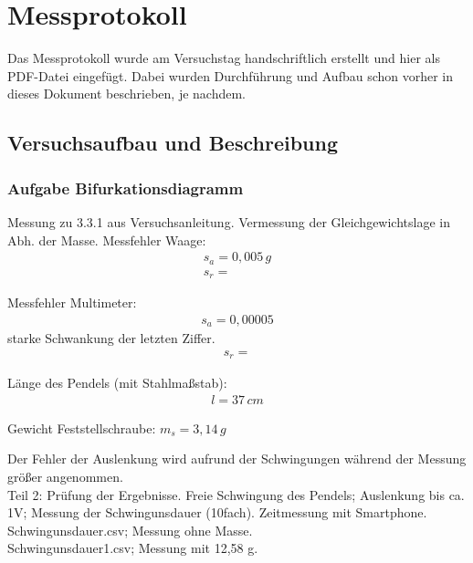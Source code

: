 

\def\skalierung{0.65}

\chapter{Messprotokoll}
\label{chap:protokoll}

Das Messprotokoll wurde am Versuchstag handschriftlich erstellt und hier als
PDF-Datei eingefügt. Dabei wurden Durchführung und Aufbau schon vorher in dieses
Dokument beschrieben, je nachdem.

\section{Versuchsaufbau und Beschreibung}
\label{sec:aufbau}



\subsection{Aufgabe Bifurkationsdiagramm}

Messung zu 3.3.1 aus Versuchsanleitung.
Vermessung der Gleichgewichtslage in Abh. der Masse.
Messfehler Waage: 
\begin{align}
    s_a = 0,005\, g \\
    s_r =
\end{align}

Messfehler Multimeter: 
\begin{align}
    s_a = 0,00005
\end{align}
starke Schwankung der letzten Ziffer.
\begin{align}
    s_r =
\end{align}

Länge des Pendels (mit Stahlmaßstab): 
\begin{align}
    l = 37 \, cm
\end{align}

Gewicht Feststellschraube: \(m_s = 3,14 \,g\)

Der Fehler der Auslenkung wird aufrund der Schwingungen während der Messung größer angenommen.\\


Teil 2: Prüfung der Ergebnisse.
Freie Schwingung des Pendels; Auslenkung bis ca. 1V; Messung der Schwingunsdauer (10fach).
Zeitmessung mit Smartphone.\\
Schwingunsdauer.csv; Messung ohne Masse.\\
Schwingunsdauer1.csv; Messung mit 12,58 g.\\

